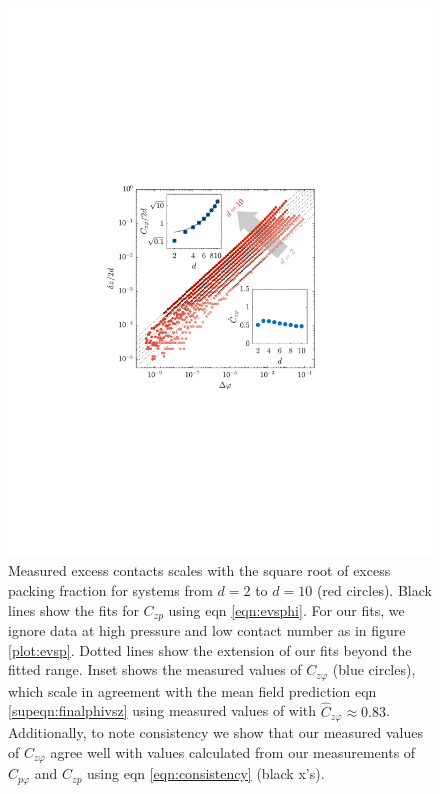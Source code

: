 \begin{figure}[th!]
\includegraphics[width=\columnwidth, trim=143 240 168 230, clip]{excessContactsScaling/evsphi.pdf}

\caption{Measured excess contacts scales with the square root of excess packing fraction for systems from $d=2$ to $d=10$ (red circles). Black lines show the fits for $C_{zp}$ using eqn \ref{eqn:evsphi}. For our fits, we ignore data at high pressure and low contact number as in figure \ref{plot:evsp}.
Dotted lines show the extension of our fits beyond the fitted range. Inset shows the measured values of $C_{z\varphi}$ (blue circles), which scale in agreement with the mean field prediction eqn \ref{supeqn:finalphivsz} using measured values of with $\hat{C}_{z\varphi} \approx 0.83$. Additionally, to note consistency we show that our measured values of $C_{z\varphi}$ agree well with values calculated from our measurements of $C_{p\varphi}$ and $C_{zp}$ using eqn \ref{eqn:consistency} (black x's).}

\label{plot:evsphi}
\end{figure}
%

